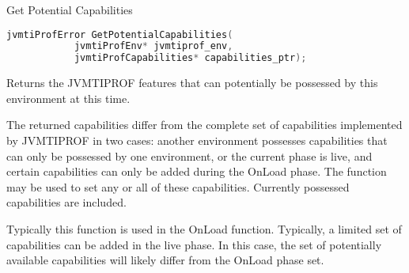 \begin{apidef}{Get Potential Capabilities}
\begin{lstlisting}[language=C]
jvmtiProfError GetPotentialCapabilities(
            jvmtiProfEnv* jvmtiprof_env,
            jvmtiProfCapabilities* capabilities_ptr);
\end{lstlisting}

\begin{apidesc}
Returns the JVMTIPROF features that can potentially be possessed by this environment at this time. 

The returned capabilities differ from the complete set of capabilities implemented by JVMTIPROF in two cases: another environment possesses capabilities that can only be possessed by one environment, or the current phase is live, and certain capabilities can only be added during the OnLoad phase. The  function may be used to set any or all of these capabilities. Currently possessed capabilities are included.

Typically this function is used in the OnLoad function. Typically, a limited set of capabilities can be added in the live phase. In this case, the set of potentially available capabilities will likely differ from the OnLoad phase set. 

\end{apidesc}

\begin{apiphase}
\apiphaseonloadlive
\end{apiphase}

\begin{apicap}
\apicaprequired
\end{apicap}

\begin{apiparam}
\end{apiparam}

\apireturnempty

\begin{apierror}
\end{apierror}
\end{apidef}


